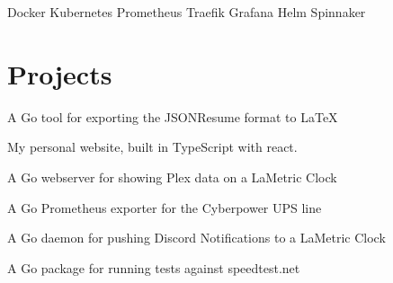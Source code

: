 \documentclass[]{modern}
\begin{document}
\begin{minipage}[t]{0.33\textwidth}
Docker \textbullet{} Kubernetes \textbullet{} Prometheus \textbullet{} Traefik \textbullet{} Grafana \textbullet{} Helm \textbullet{} Spinnaker

\sectionsep


\section{Projects}
\vspace{\topsep} %
\begin{tightemize}
\item A Go tool for exporting the JSONResume format to LaTeX
\end{tightemize}

\begin{tightemize}
\item My personal website, built in TypeScript with react.
\end{tightemize}

\begin{tightemize}
\item A Go webserver for showing Plex data on a LaMetric Clock
\end{tightemize}

\begin{tightemize}
\item A Go Prometheus exporter for the Cyberpower UPS line
\end{tightemize}

\begin{tightemize}
\item A Go daemon for pushing Discord Notifications to a LaMetric Clock
\end{tightemize}

\begin{tightemize}
\item A Go package for running tests against speedtest.net
\end{tightemize}

\sectionsep



\end{minipage}
\end{document}
